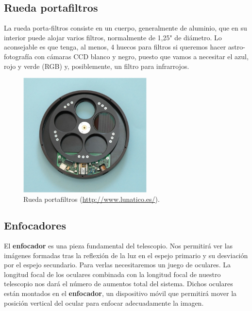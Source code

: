 \subsection{Rueda portafiltros}

La rueda porta-filtros consiste en un cuerpo, generalmente de aluminio, que en su interior puede alojar varios filtros, normalmente de 1,25" de diámetro. Lo aconsejable es que tenga, al menos, 4 huecos para filtros si queremos hacer astro-fotografía con cámaras CCD blanco y negro, puesto que vamos a necesitar el azul, rojo y verde (RGB) y, posiblemente, un filtro para infrarrojos.

\bigskip
\begin{figure}[!ht]
  \begin{center}
  \includegraphics[width=0.6\textwidth]{../images/portafiltros.jpg}
  \caption{Rueda portafiltros (\href{http://www.lunatico.es/}{http://www.lunatico.es/}).}
  \label{fig:diag_scrum}
  \end{center}
\end{figure}

\subsection{Enfocadores}

El \textbf{enfocador} es una pieza fundamental del telescopio. Nos permitirá ver las imágenes formadas tras la reflexión de la luz en el espejo primario y su desviación por el espejo secundario. Para verlas necesitaremos un juego de oculares. La longitud focal de los oculares combinada con la longitud focal de nuestro telescopio nos dará el número de aumentos total del sistema. Dichos oculares están montados en el \textbf{enfocador}, un dispositivo móvil que permitirá mover la posición vertical del ocular para enfocar adecuadamente la imagen.

